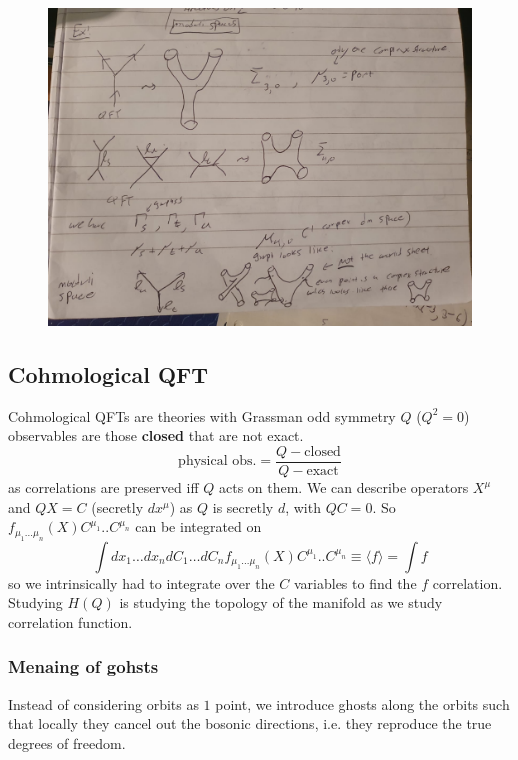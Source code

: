 \documentclass[10pt,
 article,
 amsmath,amssymb
]{revtex4-2}
\begin{document}
\begin{figure}
    \begin{center}
        \includegraphics[scale=0.2]{moduli}
    \end{center}
   
\end{figure}

\subsection{Cohmological QFT}
Cohmological QFTs are theories with Grassman odd symmetry $Q$ ($Q^2=0$) observables are those {\bf closed} that are not exact. 
$$\text{physical obs.}=\frac{Q-\text{closed}}{Q-\text{exact}}$$
as correlations are preserved iff $Q$ acts on them. We can describe operators $X^\mu$ and $QX=C$ (secretly $dx^\mu$) as $Q$ is secretly $d$,
with $QC=0$. So $f_{\mu_1 ... \mu_n}(X) C^{\mu_1}..C^{\mu_n}$ can be integrated on 
$$\int dx_1 \dots dx_n  dC_1\dots dC_n f_{\mu_1 ... \mu_n}(X) C^{\mu_1}..C^{\mu_n} \equiv \langle f \rangle =\int f$$
so we intrinsically had to integrate over the $C$ variables to find the $f$ correlation. Studying $H(Q)$ is studying the topology
of the manifold as we study correlation function.

\subsubsection{Menaing of gohsts}
Instead of considering orbits as $1$ point, we introduce ghosts along the orbits such that locally they cancel out the bosonic directions, i.e. they reproduce the 
true degrees of freedom.
\end{document}
